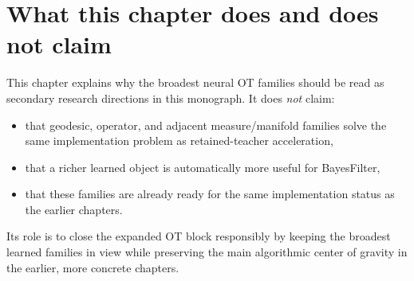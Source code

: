 \section{What this chapter does and does not claim}
\label{sec:bf-neural-ot-dynamic-boundary}

This chapter explains why the broadest neural OT families should be read as
secondary research directions in this monograph.  It does \emph{not} claim:
\begin{itemize}
  \item that geodesic, operator, and adjacent measure/manifold families solve the
  same implementation problem as retained-teacher acceleration,
  \item that a richer learned object is automatically more useful for
  BayesFilter,
  \item that these families are already ready for the same implementation status
  as the earlier chapters.
\end{itemize}
Its role is to close the expanded OT block responsibly by keeping the broadest
learned families in view while preserving the main algorithmic center of gravity
in the earlier, more concrete chapters.

\FloatBarrier
